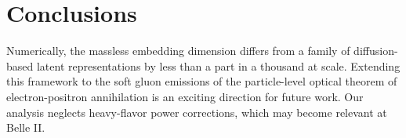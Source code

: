 \section{Conclusions}\label{sec:conclusions}

Numerically, the massless embedding dimension differs from a family of
diffusion-based latent representations by less than a part in a thousand
at scale. Extending this framework to the soft gluon emissions of the
particle-level optical theorem of electron-positron annihilation is an
exciting direction for future work. Our analysis neglects heavy-flavor
power corrections, which may become relevant at Belle II.

